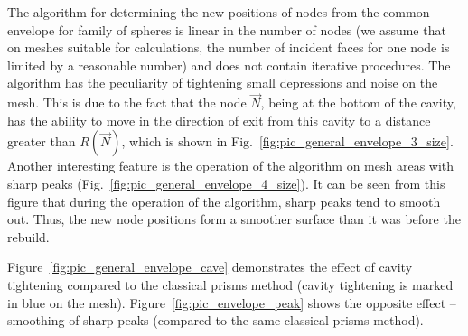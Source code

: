 \documentclass[
11pt,%
tightenlines,%
twoside,%
onecolumn,%
nofloats,%
nobibnotes,%
nofootinbib,%
superscriptaddress,%
noshowpacs,%
centertags]%
{revtex4-2}
\begin{document}
The algorithm for determining the new positions of nodes from the common envelope for family of spheres is linear in the number of nodes (we assume that on meshes suitable for calculations, the number of incident faces for one node is limited by a reasonable number) and does not contain iterative procedures.
The algorithm has the peculiarity of tightening small depressions and noise on the mesh.
This is due to the fact that the node $\vec{N}$, being at the bottom of the cavity, has the ability to move in the direction of exit from this cavity to a distance greater than $R(\vec{N})$, which is shown in Fig.~\ref{fig:pic_general_envelope_3_size}.
Another interesting feature is the operation of the algorithm on mesh areas with sharp peaks (Fig.~\ref{fig:pic_general_envelope_4_size}).
It can be seen from this figure that during the operation of the algorithm, sharp peaks tend to smooth out.
Thus, the new node positions form a smoother surface than it was before the rebuild.

Figure~\ref{fig:pic_general_envelope_cave} demonstrates the effect
of cavity tightening compared to the classical prisms method (cavity
tightening is marked in blue on the mesh).
Figure~\ref{fig:pic_envelope_peak} shows the opposite effect --
smoothing of sharp peaks (compared to the same classical prisms
method).
\end{document}
